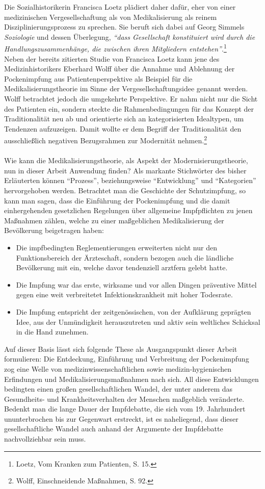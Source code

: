 \documentclass[
    a4paper,
    12pt,
    hyphens,
    chapterprefix=true,
    headheight=33pt,
    footheight=29pt,
    headings=optiontohead, %
]{scrartcl}
\begin{document}
Die Sozialhistorikerin Francisca Loetz plädiert daher dafür, eher von einer medizinischen Vergesellschaftung als von Medikalisierung als reinem Disziplinierungsprozess zu sprechen. Sie beruft sich dabei auf Georg Simmels \textit{Soziologie} und dessen Überlegung, \textit{"`dass Gesellschaft konstituiert wird durch die Handlungszusammenhänge, die zwischen ihren Mitgliedern entstehen"'}.\footnote{Loetz, Vom Kranken zum Patienten, S. 15.}\\
Neben der bereits zitierten Studie von Francisca Loetz kann jene des Medizinhistorikers Eberhard Wolff über die Annahme und Ablehnung der Pockenimpfung aus Patientenperspektive als Beispiel für die Medikalisierungstheorie im Sinne der Vergesellschaftungsidee genannt werden. Wolff betrachtet jedoch die umgekehrte Perspektive. Er nahm nicht nur die Sicht des Patienten ein, sondern steckte die Rahmenbedingungen für das Konzept der Traditionalität neu ab und orientierte sich an kategorisierten Idealtypen, um Tendenzen aufzuzeigen. Damit wollte er dem Begriff der Traditionalität den ausschließlich negativen Bezugsrahmen zur Modernität nehmen.\footnote{Wolff, Einschneidende Maßnahmen, S. 92.}\\
\\
Wie kann die Medikalisierungstheorie, als Aspekt der Modernisierungstheorie, nun in dieser Arbeit Anwendung finden? Als markante Stichwörter des bisher Erläuterten können "`Prozess"', beziehungsweise "`Entwicklung"' und "`Kategorien"' hervorgehoben werden. Betrachtet man die Geschichte der Schutzimpfung, so kann man sagen, dass die Einführung der Pockenimpfung und die damit einhergehenden gesetzlichen Regelungen über allgemeine Impfpflichten zu jenen Maßnahmen zählen, welche zu einer maßgeblichen Medikalisierung der Bevölkerung beigetragen haben:
\begin{itemize}
\item{Die impfbedingten Reglementierungen erweiterten nicht nur den Funktionsbereich der Ärzteschaft, sondern bezogen auch die ländliche Bevölkerung mit ein, welche davor tendenziell arztfern gelebt hatte.}
\item{Die Impfung war das erste, wirksame und vor allen Dingen präventive Mittel gegen eine weit verbreitetet Infektionskrankheit mit hoher Todesrate.}
\item{Die Impfung entspricht der zeitgenössischen, von der Aufklärung geprägten Idee, aus der Unmündigkeit herauszutreten und aktiv sein weltliches Schicksal in die Hand zunehmen.}
\end{itemize}
Auf dieser Basis lässt sich folgende These als Ausgangspunkt dieser Arbeit formulieren: Die Entdeckung, Einführung und Verbreitung der Pockenimpfung zog eine Welle von medizinwissenschaftlichen sowie medizin-hygienischen Erfindungen und Medikalisierungsmaßnahmen nach sich. All diese Entwicklungen bedingten einen großen gesellschaftlichen Wandel, der unter anderem das Gesundheits- und Krankheitsverhalten der Menschen maßgeblich veränderte. Bedenkt man die lange Dauer der Impfdebatte, die sich vom 19. Jahrhundert ununterbrochen bis zur Gegenwart erstreckt, ist es naheliegend, dass dieser gesellschaftliche Wandel auch anhand der Argumente der Impfdebatte nachvollziehbar sein muss.
\end{document}
